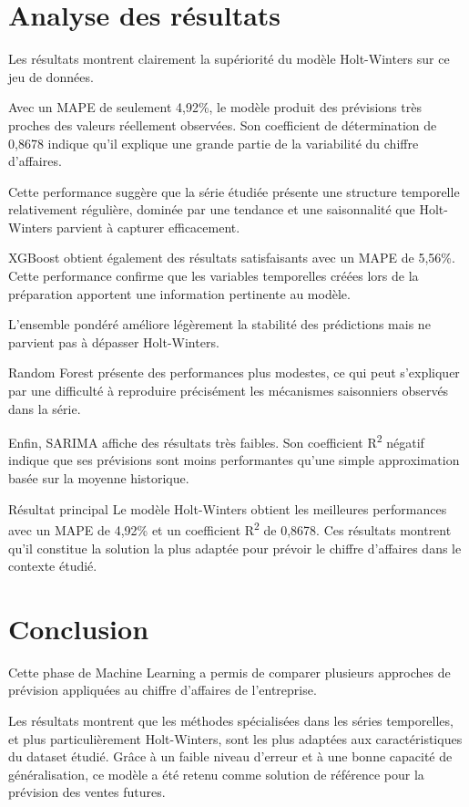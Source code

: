 \documentclass[12pt,a4paper,twoside]{report}
\begin{document}
\section{Analyse des résultats}

Les résultats montrent clairement la supériorité du modèle Holt-Winters sur ce jeu de données.

Avec un MAPE de seulement 4,92\%, le modèle produit des prévisions très proches des valeurs réellement observées. Son coefficient de détermination de 0,8678 indique qu'il explique une grande partie de la variabilité du chiffre d'affaires.

Cette performance suggère que la série étudiée présente une structure temporelle relativement régulière, dominée par une tendance et une saisonnalité que Holt-Winters parvient à capturer efficacement.

XGBoost obtient également des résultats satisfaisants avec un MAPE de 5,56\%. Cette performance confirme que les variables temporelles créées lors de la préparation apportent une information pertinente au modèle.

L'ensemble pondéré améliore légèrement la stabilité des prédictions mais ne parvient pas à dépasser Holt-Winters.

Random Forest présente des performances plus modestes, ce qui peut s'expliquer par une difficulté à reproduire précisément les mécanismes saisonniers observés dans la série.

Enfin, SARIMA affiche des résultats très faibles. Son coefficient R\textsuperscript{2} négatif indique que ses prévisions sont moins performantes qu'une simple approximation basée sur la moyenne historique.

\begin{resultbox}{Résultat principal}
Le modèle Holt-Winters obtient les meilleures performances avec un MAPE de 4,92\% et un coefficient R\textsuperscript{2} de 0,8678. Ces résultats montrent qu'il constitue la solution la plus adaptée pour prévoir le chiffre d'affaires dans le contexte étudié.
\end{resultbox}

\section{Conclusion}

Cette phase de Machine Learning a permis de comparer plusieurs approches de prévision appliquées au chiffre d'affaires de l'entreprise.

Les résultats montrent que les méthodes spécialisées dans les séries temporelles, et plus particulièrement Holt-Winters, sont les plus adaptées aux caractéristiques du dataset étudié. Grâce à un faible niveau d'erreur et à une bonne capacité de généralisation, ce modèle a été retenu comme solution de référence pour la prévision des ventes futures.
\end{document}
